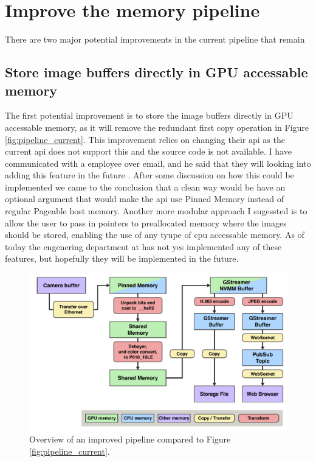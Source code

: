 \section{Improve the memory pipeline}
\label{sec:memory_pipeline_improvements}

There are two major potential improvements in the current pipeline that remain

\subsection{Store image buffers directly in GPU accessable memory}
The first potential improvement is to store the image buffers directly in GPU accessable memory, as it will remove the redundant first copy operation in Figure \ref{fig:pipeline_current}.
This improvement relies on \lucid changing their \gls{api} as the current \gls{api} does not support this and the source code is not available.
I have communicated with a \lucid employee over email, and he said that they will looking into adding this feature in the future \cite{martensRe17896Use2023}.
After some discussion on how this could be implemented we came to the conclusion that a clean way would be have an optional argument that would make the \gls{api} use Pinned Memory instead of regular Pageable host memory.
Another more modular approach I sugessted is to allow the user to pass in pointers to preallocated memory where the images should be stored, enabling the use of any tyupe of \gls{cpu} accessable memory.
As of today the engenering department at \lucid has not yes implemented any of these features, but hopefully they will be implemented in the future.

\begin{figure}[H]
    \centering
    \includegraphics[width=\textwidth]{figures/memory_pipeline/optimal.pdf}
    \caption{Overview of an improved pipeline compared to Figure \ref{fig:pipeline_current}.}
    \label{fig:pipeline_optimal}
\end{figure}

